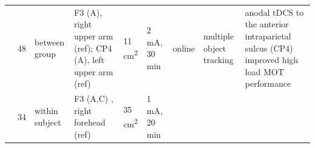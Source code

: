 \documentclass[11pt,english,]{memoir}
\begin{document}
\begin{longtable}[]{@{}lllllllll@{}}
\begin{minipage}[t]{0.08\columnwidth}
\textcite{Blumberg2015}\strut
\end{minipage} & \begin{minipage}[t]{0.03\columnwidth}\raggedright
48\strut
\end{minipage} & \begin{minipage}[t]{0.05\columnwidth}\raggedright
between
group\strut
\end{minipage} & \begin{minipage}[t]{0.12\columnwidth}\raggedright
F3 (A), right upper
arm (ref); CP4 (A),
left upper arm (ref)\strut
\end{minipage} & \begin{minipage}[t]{0.04\columnwidth}\raggedright
11
cm\textsuperscript{2}\strut
\end{minipage} & \begin{minipage}[t]{0.05\columnwidth}\raggedright
2 mA,
30 min\strut
\end{minipage} & \begin{minipage}[t]{0.05\columnwidth}\raggedright
online\strut
\end{minipage} & \begin{minipage}[t]{0.08\columnwidth}\raggedright
multiple
object
tracking\strut
\end{minipage} & \begin{minipage}[t]{0.27\columnwidth}\raggedright
anodal tDCS to the anterior intraparietal sulcus
(CP4) improved high load MOT performance\strut
\end{minipage}\tabularnewline
\begin{minipage}[t]{0.08\columnwidth}\raggedright
\textcite{London2015}\strut
\end{minipage} & \begin{minipage}[t]{0.03\columnwidth}\raggedright
34\strut
\end{minipage} & \begin{minipage}[t]{0.05\columnwidth}\raggedright
within
subject\strut
\end{minipage} & \begin{minipage}[t]{0.12\columnwidth}\raggedright
F3 (A,C) , right
forehead (ref)\strut
\end{minipage} & \begin{minipage}[t]{0.04\columnwidth}\raggedright
35
cm\textsuperscript{2}\strut
\end{minipage} & \begin{minipage}[t]{0.05\columnwidth}\raggedright
1 mA,
20 min\strut
\end{minipage} & \begin{minipage}[t]{0.05\columnwidth}\raggedright

\end{minipage}
\end{longtable}
\end{document}
